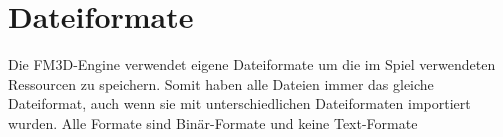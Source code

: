\section{Dateiformate}
	
Die FM3D-Engine verwendet eigene Dateiformate um die im Spiel verwendeten Ressourcen zu speichern. Somit haben alle Dateien immer das gleiche Dateiformat, auch wenn sie mit unterschiedlichen Dateiformaten importiert wurden. Alle Formate sind Binär-Formate und keine Text-Formate 